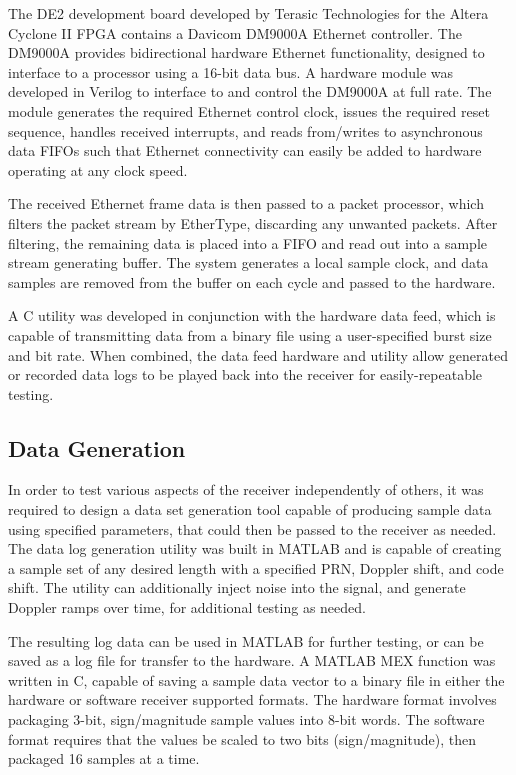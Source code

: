 \documentclass[12pt]{article}
\begin{document}
The DE2 development board developed by Terasic Technologies for the Altera Cyclone II FPGA contains a Davicom DM9000A Ethernet controller. The DM9000A provides bidirectional hardware Ethernet functionality, designed to interface to a processor using a 16-bit data bus. A hardware module was developed in Verilog to interface to and control the DM9000A at full rate. The module generates the required Ethernet control clock, issues the required reset sequence, handles received interrupts, and reads from/writes to asynchronous data FIFOs such that Ethernet connectivity can easily be added to hardware operating at any clock speed.

The received Ethernet frame data is then passed to a packet processor, which filters the packet stream by EtherType, discarding any unwanted packets. After filtering, the remaining data is placed into a FIFO and read out into a sample stream generating buffer. The system generates a local sample clock, and data samples are removed from the buffer on each cycle and passed to the hardware.

A C utility was developed in conjunction with the hardware data feed, which is capable of transmitting data from a binary file using a user-specified burst size and bit rate. When combined, the data feed hardware and utility allow generated or recorded data logs to be played back into the receiver for easily-repeatable testing.

\subsection{Data Generation}
\label{sec:data generation}
In order to test various aspects of the receiver independently of others, it was required to design a data set generation tool capable of producing sample data using specified parameters, that could then be passed to the receiver as needed. The data log generation utility was built in MATLAB and is capable of creating a sample set of any desired length with a specified PRN, Doppler shift, and code shift. The utility can additionally inject noise into the signal, and generate Doppler ramps over time, for additional testing as needed.

The resulting log data can be used in MATLAB for further testing, or can be saved as a log file for transfer to the hardware. A MATLAB MEX function was written in C, capable of saving a sample data vector to a binary file in either the hardware or software receiver supported formats. The hardware format involves packaging 3-bit, sign/magnitude sample values into 8-bit words. The software format requires that the values be scaled to two bits (sign/magnitude), then packaged 16 samples at a time.
\end{document}
